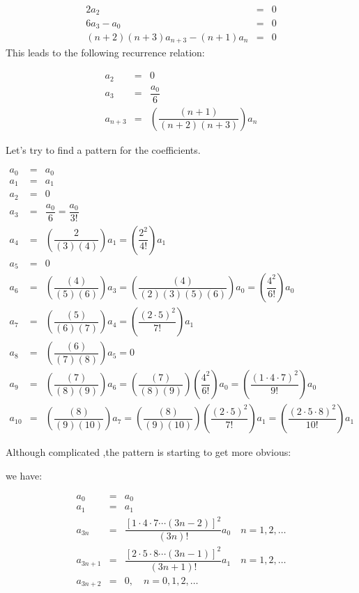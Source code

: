 \documentclass[11pt]{article}
\begin{document}
\begin{solution}
\begin{eqnarray*}
2a_{2} & = & 0 \\
6a_{3} - a_{0} & = & 0 \\
(n+2)(n+3) a_{n+3}-(n+1)a_{n} & = & 0
\end{eqnarray*}
This leads to the following recurrence relation:

\begin{eqnarray*}
a_{2} & = & 0 \\
a_{3} & = & \dfrac{a_{0}}{6} \\
 a_{n+3} & = & \left(\dfrac{(n+1)}{(n+2)(n+3)}\right)a_{n}
\end{eqnarray*}

Let's try to find a pattern for the coefficients.

\begin{eqnarray*}
a_{0} & = & a_{0} \\
a_{1} & = & a_{1}\\
a_{2} & = & 0 \\
a_{3} & = & \dfrac{a_{0}}{6}  = \dfrac{a_{0}}{3!}  \\
a_{4} & = & \left(\dfrac{2}{(3)(4)}\right)a_{1}  =  \left(\dfrac{2^2}{4!}\right)a_{1}  \\
a_{5} & = & 0 \\
a_{6} & = & \left(\dfrac{(4)}{(5)(6)}\right)a_{3} = \left(\dfrac{(4)}{(2)(3)(5)(6)}\right)a_{0} = \left(\dfrac{4^2}{6!}\right)a_{0} \\
a_{7} & = & \left(\dfrac{(5)}{(6)(7)}\right)a_{4} = \left(\dfrac{(2 \cdot 5)^2}{7!}\right) a_{1} \\
a_{8} & = & \left(\dfrac{(6)}{(7)(8)}\right)a_{5} = 0 \\
a_{9} & = & \left(\dfrac{(7)}{(8)(9)}\right)a_{6} = \left(\dfrac{(7)}{(8)(9)}\right)\left(\dfrac{4^2}{6!}\right)a_{0} =\left(\dfrac{(1 \cdot 4 \cdot 7)^2}{9!}\right)a_{0}  \\
a_{10} & = & \left(\dfrac{(8)}{(9)(10)}\right)a_{7} = \left(\dfrac{(8)}{(9)(10)}\right)\left(\dfrac{(2 \cdot 5)^2}{7!}\right) a_{1} = \left(\dfrac{(2 \cdot 5 \cdot 8)^2}{10!}\right)a_{1}
\end{eqnarray*}

Although complicated ,the pattern is starting to get more obvious:

we have:

\begin{eqnarray*}
a_{0} & = & a_{0}\\
a_{1} & = & a_{1}\\
a_{3n} & = & \dfrac{\left[1 \cdot 4 \cdot 7 \cdots (3n-2) \right]^2}{(3n)!}a_{0} \quad n=1,2, \ldots \\
a_{3n+1} & = & \dfrac{\left[2 \cdot 5 \cdot 8 \cdots (3n-1) \right]^2}{(3n+1)!}a_{1} \quad n=1,2, \ldots \\
a_{3n+2} & = & 0, \quad n=0,1,2, \ldots \\
\end{eqnarray*}


\end{solution}
\end{document}
